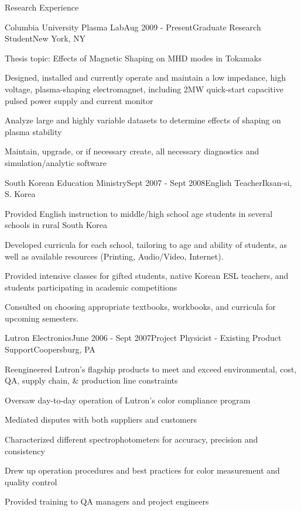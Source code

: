 \documentclass{resume} %
\begin{document}
\begin{rSection}{Research Experience}

\begin{rSubsection}{Columbia University Plasma Lab}{Aug 2009 - Present}{Graduate Research Student}{New York, NY}
\item	Thesis topic: Effects of Magnetic Shaping on MHD modes in Tokamaks 
\item	Designed, installed and currently operate and maintain a low impedance, high voltage, plasma-shaping electromagnet, including 2MW quick-start capacitive pulsed power supply and current monitor
\item	Analyze large and highly variable datasets to determine effects of shaping on plasma stability
\item   Maintain, upgrade, or if necessary create, all necessary diagnostics and simulation/analytic software

\end{rSubsection}


\begin{rSubsection}{South Korean Education Ministry}{Sept 2007 - Sept 2008}{English Teacher}{Iksan-si, S. Korea }
\item Provided English instruction to middle/high school age students in several schools in rural South Korea
\item Developed curricula for each school, tailoring to age and ability of students, as well as available resources (Printing, Audio/Video, Internet).
\item Provided intensive classes for gifted students, native Korean ESL teachers, and students participating in academic competitions
\item Consulted on choosing appropriate textbooks, workbooks, and curricula for upcoming semesters.
\end{rSubsection}


\begin{rSubsection}{Lutron Electronics}{June 2006 - Sept 2007}{Project Physicist - Existing Product Support}{Coopersburg, PA}
\item	Reengineered Lutron's flagship products to meet and exceed environmental, cost, QA, supply chain, \& production line constraints
\item	Oversaw day-to-day operation of Lutron’s color compliance program
\begin{rSubsubsection}
\item Mediated disputes with both suppliers and customers
\item Characterized different spectrophotometers for accuracy, precision and consistency
\item Drew up operation procedures and best practices for color measurement and quality control
\item Provided training to QA managers and project engineers
\end{rSubsubsection}
\end{rSubsection}

\end{rSection}
\end{document}
